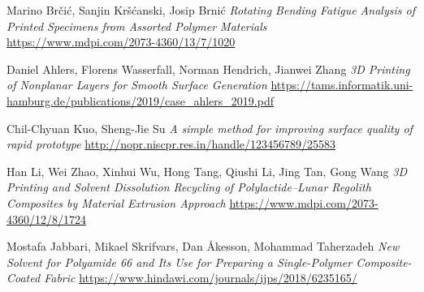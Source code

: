 \documentclass[12pt,a4paper]{article}
\begin{document}
\begin{thebibliography}{9}
Marino Brčić, Sanjin Kršćanski, Josip Brnić
\textit{Rotating Bending Fatigue Analysis of Printed Specimens from Assorted Polymer Materials }
\url{https://www.mdpi.com/2073-4360/13/7/1020}

Daniel Ahlers, Florens Wasserfall, Norman Hendrich, Jianwei Zhang
\textit{3D Printing of Nonplanar Layers for Smooth Surface Generation}
\url{https://tams.informatik.uni-hamburg.de/publications/2019/case_ahlers_2019.pdf}

Chil-Chyuan Kuo, Sheng-Jie Su
\textit{A simple method for improving surface quality of rapid prototype}
\url{http://nopr.niscpr.res.in/handle/123456789/25583}

Han Li, Wei Zhao, Xinhui Wu, Hong Tang, Qiushi Li, Jing Tan, Gong Wang
\textit{3D Printing and Solvent Dissolution Recycling of Polylactide–Lunar Regolith Composites by Material Extrusion Approach }
\url{https://www.mdpi.com/2073-4360/12/8/1724}

Mostafa Jabbari, Mikael Skrifvars, Dan Åkesson, Mohammad Taherzadeh
\textit{New Solvent for Polyamide 66 and Its Use for Preparing a Single-Polymer Composite-Coated Fabric}
\url{https://www.hindawi.com/journals/ijps/2018/6235165/}

\end{thebibliography}
\end{document}
